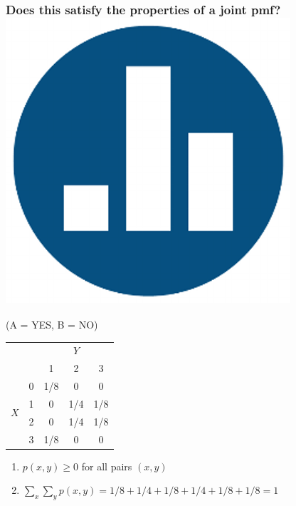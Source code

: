 \documentclass[handout]{beamer}
\begin{document}
\begin{frame}
\frametitle{Does this satisfy the properties of a joint pmf? \hfill \includegraphics[scale = 0.05]{./images/clicker}}
\alert{(A = YES, B = NO)}
\begin{table}
\begin{tabular}{|cc|ccc|}
\hline
&&\multicolumn{3}{c|}{$Y$}\\
&&1 & 2&3\\
\hline
\multirow{4}{*}{$X$}
&0& \multicolumn{1}{|c}{\alert{1/8}} & \alert{0}& \alert{0}\\
&1& \multicolumn{1}{|c}{\alert{0}} & \alert{1/4}&\alert{1/8}\\
&2& \multicolumn{1}{|c}{\alert{0}} & \alert{1/4}&\alert{1/8}\\
&3& \multicolumn{1}{|c}{\alert{1/8}} & \alert{0}&\alert{0}\\
\hline
\end{tabular}
\end{table}

\pause

\begin{enumerate}
	\item $p(x,y) \geq 0$ for all pairs $(x,y)$
	\item $\sum_x\sum_{y} p(x,y) = 1/8 + 1/4 + 1/8 + 1/4 + 1/8 + 1/8 = 1$
\end{enumerate}

\end{frame}
\end{document}

